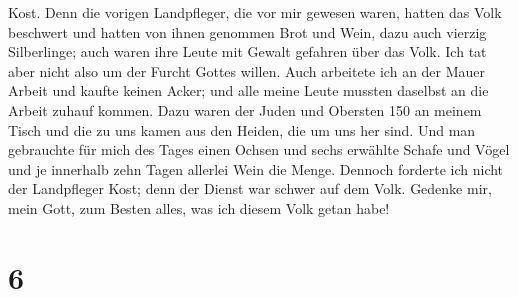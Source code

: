 Kost.  Denn die vorigen Landpfleger, die vor mir gewesen
waren, hatten das Volk beschwert und hatten von ihnen genommen Brot und
Wein, dazu auch vierzig Silberlinge; auch waren ihre Leute mit Gewalt
gefahren über das Volk. Ich tat aber nicht also um der Furcht Gottes
willen.  Auch arbeitete ich an der Mauer Arbeit und
kaufte keinen Acker; und alle meine Leute mussten daselbst an die Arbeit
zuhauf kommen.  Dazu waren der Juden und Obersten 150 an
meinem Tisch und die zu uns kamen aus den Heiden, die um uns her sind.
 Und man gebrauchte für mich des Tages einen Ochsen und
sechs erwählte Schafe und Vögel und je innerhalb zehn Tagen allerlei
Wein die Menge. Dennoch forderte ich nicht der Landpfleger Kost; denn
der Dienst war schwer auf dem Volk.  Gedenke mir, mein
Gott, zum Besten alles, was ich diesem Volk getan habe!

\hypertarget{section-5}{%
\section{6}\label{section-5}}

